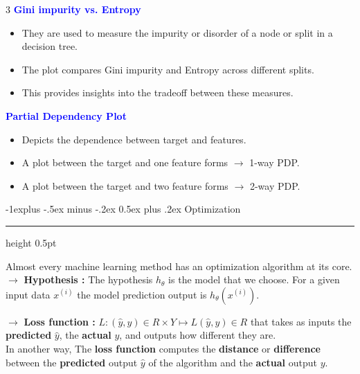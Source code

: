 \documentclass[letterpaper, 10.5pt,landscape]{article}
\makeatletter
\renewcommand{\subsection}{\@startsection{subsection}{2}{0mm}%
                                {-1explus -.5ex minus -.2ex}%
                                {0.5ex plus .2ex}%
                                {\normalfont\normalsize\bfseries}}
\makeatother
\begin{document}
\begin{multicols*}{3}
\textbf{\textcolor{blue}{Gini impurity vs. Entropy}}
\vspace{-2pt}
\begin{itemize}[leftmargin=4mm]
    \item They are used to measure the impurity or disorder of a node or split in a decision tree.
    \vspace{-2pt}
    \item The plot compares Gini impurity and Entropy across different splits.
    \vspace{-2pt}
    \item This provides insights into the tradeoff between these measures.
\end{itemize}



\textbf{\textcolor{blue}{Partial Dependency Plot}}
\vspace{-2pt}
\begin{itemize}[leftmargin=4mm]
    \item Depicts the dependence between target and features.
    \vspace{-2pt}
    \item A plot between the target and one feature forms $\rightarrow$ 1-way PDP.
    \vspace{-2pt}
    \item A plot between the target and two feature forms $\rightarrow$ 2-way PDP.
\end{itemize}







\subsection{Optimization} {\color{teal}\hrule height 0.5pt} \smallskip

Almost every machine learning method has an optimization algorithm at its core. \\
$\rightarrow$ \textbf{Hypothesis :} The hypothesis $h_{\theta}$ is the model that we choose. For a given input data $x^{(i)}$ the model prediction output is $\boxed{h_{\theta}(x^{(i)})}$. 

\vspace{3pt}

$\rightarrow$ \textbf{Loss function : } 
\(\boxed{L:(\hat{y},y)  \in  R \times Y \longmapsto  L(\hat{y},y) \in R} \) that takes as inputs the \textbf{predicted} $\hat{y}$, the \textbf{actual}  $y$, and outputs how different they are. \\
In another way, The \textbf{loss function} computes the \textbf{distance} or \textbf{difference} between the \textbf{predicted} output $\hat{y}$ of the algorithm and the \textbf{actual} output $y$. 


\end{multicols*}
\end{document}
